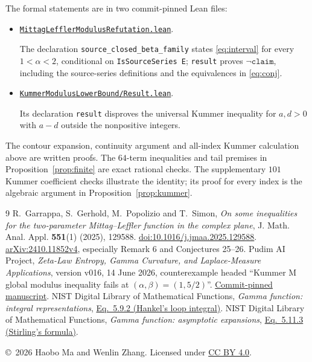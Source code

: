 \documentclass[11pt]{article}
\begin{document}
The formal statements are in two commit-pinned Lean files:
\begin{itemize}
\item \href{https://github.com/the-omega-institute/trureturing/blob/31e6846798fc7b0349538fb9792b6d53d3f60566/D5/S3/Analytic/Asymptotics/MittagLefflerModulusRefutation.lean}{\texttt{MittagLefflerModulusRefutation.lean}}.\par
The declaration \texttt{source\_closed\_beta\_family} states
\eqref{eq:interval} for every $1<\alpha<2$, conditional on
\texttt{IsSourceSeries E}; \texttt{result} proves
$\neg\texttt{claim}$, including the source-series definitions and
the equivalences in \eqref{eq:conj}.
\item \href{https://github.com/the-omega-institute/trureturing/blob/31e6846798fc7b0349538fb9792b6d53d3f60566/D5/S3/Analytic/KummerModulusLowerBound/Result.lean}{\texttt{KummerModulusLowerBound/Result.lean}}.\par
Its declaration \texttt{result} disproves the universal Kummer inequality
for $a,d>0$ with $a-d$ outside the nonpositive integers.
\end{itemize}
The contour expansion, continuity argument and all-index Kummer calculation
above are written proofs. The $64$-term inequalities and tail premises in
Proposition~\ref{prop:finite} are exact rational checks. The supplementary
$101$ Kummer coefficient checks illustrate the identity; its proof for
every index is the algebraic argument in Proposition~\ref{prop:kummer}.

\begin{thebibliography}{9}
R.~Garrappa, S.~Gerhold, M.~Popolizio and T.~Simon,
\emph{On some inequalities for the two-parameter Mittag--Leffler function
in the complex plane}, J. Math. Anal. Appl. \textbf{551}(1) (2025),
129588. \href{https://doi.org/10.1016/j.jmaa.2025.129588}{doi:10.1016/j.jmaa.2025.129588}.
\href{https://arxiv.org/abs/2410.11852v4}{arXiv:2410.11852v4},
especially Remark 6 and Conjectures 25--26.
Pudim AI Project,
\emph{Zeta-Law Entropy, Gamma Curvature, and Laplace-Measure Applications},
version v016, 14 June 2026, counterexample headed
``Kummer M global modulus inequality fails at $(\alpha,\beta)=(1,5/2)$''.
\href{https://github.com/pudim-project/pudim-ai-demo-zetalaw/blob/d424fdf5c1973128603c798140d9af8d388679a2/theory/versions/v016/THEORY_v016.tex}{Commit-pinned manuscript}.
NIST Digital Library of Mathematical Functions,
\emph{Gamma function: integral representations},
\href{https://dlmf.nist.gov/5.9.E2}{Eq.~5.9.2 (Hankel's loop integral)}.
NIST Digital Library of Mathematical Functions,
\emph{Gamma function: asymptotic expansions},
\href{https://dlmf.nist.gov/5.11.E3}{Eq.~5.11.3 (Stirling's formula)}.
\end{thebibliography}
\noindent\small\copyright\ 2026 Haobo Ma and Wenlin Zhang.
Licensed under \href{https://creativecommons.org/licenses/by/4.0/}{CC BY 4.0}.
\end{document}
